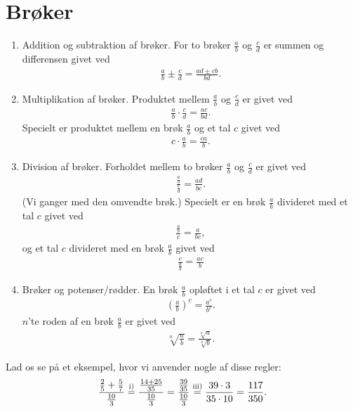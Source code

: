 \section*{Brøker}
\begin{enumerate}[label=\roman*)]
\item Addition og subtraktion af brøker. For to brøker $\frac{a}{b}$ og $\frac{c}{d}$ er summen og differensen givet ved
\begin{align*}
\frac{a}{b} \pm \frac{c}{d} = \frac{ad\pm cb}{bd}.
\end{align*}
\item Multiplikation af brøker. Produktet mellem $\frac{a}{b}$ og $\frac{c}{d}$ er givet ved
\begin{align*}
\frac{a}{b}\cdot \frac{c}{d} = \frac{ac}{bd}.
\end{align*}
Specielt er produktet mellem en brøk $\frac{a}{b}$ og et tal $c$ givet ved
\begin{align*}
c\cdot \frac{a}{b} = \frac{ca}{b}.
\end{align*}
\item Division af brøker. Forholdet mellem to brøker $\frac{a}{b}$ og $\frac{c}{d}$ er givet ved
\begin{align*}
\frac{\frac{a}{b}}{\frac{c}{d}} = \frac{ad}{bc}.
\end{align*}
(Vi ganger med den omvendte brøk.) Specielt er en brøk $\frac{a}{b}$ divideret med et tal $c$ givet ved
\begin{align*}
\frac{\frac{a}{b}}{c} = \frac{a}{bc},
\end{align*}
og et tal $c$ divideret med en brøk $\frac{a}{b}$ givet ved
\begin{align*}
\frac{c}{\frac{a}{b}} = \frac{ac}{b}
\end{align*}
\item Brøker og potenser/rødder. En brøk $\frac{a}{b}$ opløftet i et tal $c$ er givet ved 
\begin{align*}
\left(\frac{a}{b}\right)^{c} = \frac{a^c}{b^c}.
\end{align*}
$n$'te roden af en brøk $\frac{a}{b}$ er givet ved 
\begin{align*}
\sqrt[n]{\frac{a}{b}} = \frac{\sqrt[n]{a}}{\sqrt[n]{b}}.
\end{align*}
\end{enumerate}
\begin{exa}
Lad os se på et eksempel, hvor vi anvender nogle af disse regler:
\begin{align*}
\frac{\frac{2}{5}+\frac{5}{7}}{\frac{10}{3}} \overset{\textnormal{i)}}{=} \frac{\frac{14+25}{35}}{\frac{10}{3}} = \frac{\frac{39}{35}}{\frac{10}{3}} \overset{\textnormal{iii)}}{=} \frac{39\cdot 3}{35 \cdot 10} = \frac{117}{350}.
\end{align*}
\end{exa}
